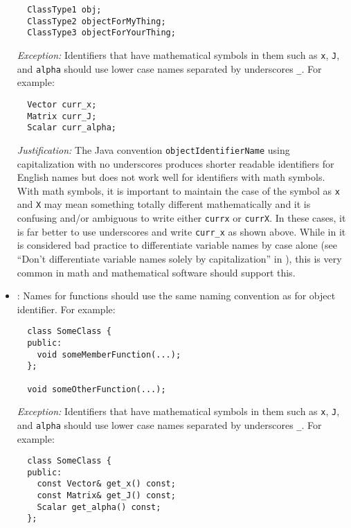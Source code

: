 \begin{itemize}
{\small\begin{verbatim}
  ClassType1 obj;
  ClassType2 objectForMyThing;
  ClassType3 objectForYourThing;
\end{verbatim}}


{}\textit{Exception:} Identifiers that have mathematical symbols in them such
as {}\texttt{x}, {}\texttt{J}, and {}\texttt{alpha} should use lower case
names separated by underscores {}\texttt{\_}.  For example:

{\small\begin{verbatim}
  Vector curr_x;
  Matrix curr_J;
  Scalar curr_alpha;
\end{verbatim}}


{}\textit{Justification:} The Java convention {}\texttt{objectIdentifierName}
using capitalization with no underscores produces shorter readable identifiers
for English names but does not work well for identifiers with math symbols.
With math symbols, it is important to maintain the case of the symbol as
{}\texttt{x} and {}\texttt{X} may mean something totally different
mathematically and it is confusing and/or ambiguous to write either
{}\texttt{currx} or {}\texttt{currX}.  In these cases, it is far better to use
underscores and write {}\texttt{curr\_x} as shown above.  While in it is
considered bad practice to differentiate variable names by case alone (see
``Don't differentiate variable names solely by capitalization'' in
{}\cite[Section 11.7]{CodeComplete2nd04}), this is very common in math and
mathematical software should support this.


{}\item\NCFunctionNames: Names for functions should use the same naming
convention as for object identifier.  For example:

{\small\begin{verbatim}
  class SomeClass {
  public:
    void someMemberFunction(...);
  };

  void someOtherFunction(...);
\end{verbatim}}


{}\textit{Exception:} Identifiers that have mathematical symbols in them such
as {}\texttt{x}, {}\texttt{J}, and {}\texttt{alpha} should use lower case
names separated by underscores {}\texttt{\_}.  For example:

{\small\begin{verbatim}
  class SomeClass {
  public:
    const Vector& get_x() const;
    const Matrix& get_J() const;
    Scalar get_alpha() const;
  };
\end{verbatim}}



\end{itemize}
